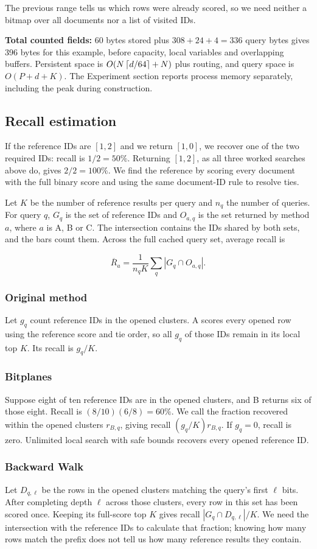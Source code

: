The previous range tells us which rows were already scored, so we need neither a bitmap over all documents nor a list of visited IDs.

\textbf{Total counted fields:} 60 bytes stored plus $308+24+4=336$ query bytes gives 396 bytes for this example, before capacity, local variables and overlapping buffers. Persistent space is $O(N\left\lceil d/64\right\rceil+N)$ plus routing, and query space is $O(P+d+K)$. The Experiment section reports process memory separately, including the peak during construction.

\subsection{Recall estimation}
If the reference IDs are $[1,2]$ and we return $[1,0]$, we recover one of the two required IDs: recall is $1/2=50\%$. Returning $[1,2]$, as all three worked searches above do, gives $2/2=100\%$. We find the reference by scoring every document with the full binary score and using the same document-ID rule to resolve ties.

Let $K$ be the number of reference results per query and $n_q$ the number of queries. For query $q$, $G_q$ is the set of reference IDs and $O_{a,q}$ is the set returned by method $a$, where $a$ is A, B or C. The intersection contains the IDs shared by both sets, and the bars count them. Across the full cached query set, average recall is

\[
 \overline R_a=\frac{1}{n_qK}\sum_q|G_q\cap O_{a,q}|.
\]
\subsubsection{Original method}
Let $g_q$ count reference IDs in the opened clusters. A scores every opened row using the reference score and tie order, so all $g_q$ of those IDs remain in its local top $K$. Its recall is $g_q/K$.

\subsubsection{Bitplanes}
Suppose eight of ten reference IDs are in the opened clusters, and B returns six of those eight. Recall is $(8/10)(6/8)=60\%$. We call the fraction recovered within the opened clusters $r_{B,q}$, giving recall $(g_q/K)r_{B,q}$. If $g_q=0$, recall is zero. Unlimited local search with safe bounds recovers every opened reference ID.

\subsubsection{Backward Walk}
Let $D_{q,\ell}$ be the rows in the opened clusters matching the query's first $\ell$ bits. After completing depth $\ell$ across those clusters, every row in this set has been scored once. Keeping its full-score top $K$ gives recall $|G_q\cap D_{q,\ell}|/K$. We need the intersection with the reference IDs to calculate that fraction; knowing how many rows match the prefix does not tell us how many reference results they contain.

